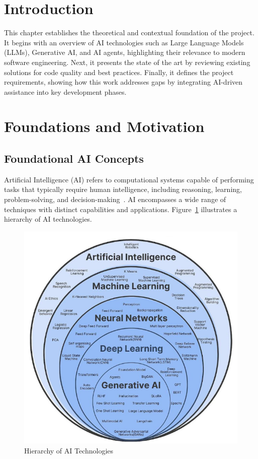 \begin{spacing}{1.2}

\section*{Introduction}
This chapter establishes the theoretical and contextual foundation of the project. It begins with an overview of AI technologies such as Large Language Models (LLMs), Generative AI, and AI agents, highlighting their relevance to modern software engineering. Next, it presents the state of the art by reviewing existing solutions for code quality and best practices. Finally, it defines the project requirements, showing how this work addresses gaps by integrating AI-driven assistance into key development phases.

\section{Foundations and Motivation}

\subsection{Foundational AI Concepts}
Artificial Intelligence (AI) refers to computational systems capable of performing tasks that typically require human intelligence, including reasoning, learning, problem-solving, and decision-making~\cite{ai2024definition}. AI encompasses a wide range of techniques with distinct capabilities and applications. Figure~\ref{fig:ai_hierarchy} illustrates a hierarchy of AI technologies.

\begin{figure}[H]
\centering
\includegraphics[scale=0.6]{Images/AI.png}
\caption{Hierarchy of AI Technologies}
\label{fig:ai_hierarchy}
\end{figure}


\end{spacing}
